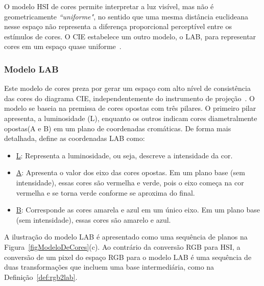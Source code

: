 O modelo HSI de cores permite interpretar a luz visível, mas não é geometricamente \textit{``uniforme"}, no sentido que uma mesma distância euclideana nesse espaço não representa a diferença proporcional perceptível entre os estímulos de cores. 
O CIE estabelece um outro modelo, o LAB, para representar cores em um espaço quase uniforme~\cite{Connolly1997}.

\subsubsection{Modelo LAB}

Este modelo de cores preza por gerar um espaço com alto nível de consistência das cores do diagrama CIE, independentemente do instrumento de projeção~\cite{johnson2003}. 
O modelo se baseia na premissa de cores opostas com três pilares. 
O primeiro pilar apresenta, a luminosidade (L), enquanto os outros indicam cores diametralmente opostas(A e B) em um plano de coordenadas cromáticas. 
De forma mais detalhada,  define as coordenadas LAB como:

\begin{itemize}

    \item \underline{L}: Representa a luminosidade, ou seja, descreve a intensidade da cor.
    
    \item \underline{A}: Apresenta o valor dos eixo das cores opostas. 
    Em um plano base (sem intensidade), essas cores são vermelha e verde, pois o eixo começa na cor vermelha e se torna verde conforme se aproxima do final. 

    \item \underline{B}: Corresponde as cores amarela e azul em um único eixo.
    Em um plano base (sem intensidade), essas cores são amarelo e azul.
\end{itemize}

A ilustração do modelo LAB é apresentado como uma sequência de planos na Figura~\ref{figModeloDeCores}(c).
Ao contrário da conversão RGB para HSI, a conversão de um pixel do espaço RGB para o modelo LAB é uma sequência de duas transformações que incluem uma base intermediária, como na Definição~\ref{def:rgb2lab}.

